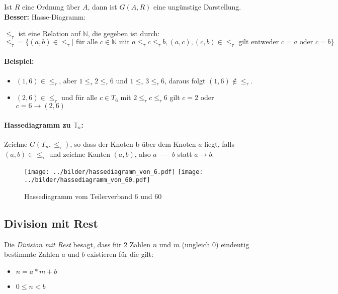 \noindent Ist $R$ eine Ordnung über $A$, dann ist $G (A, R)$ eine ungünstige Darstellung. \\ {\bf Besser:} Hasse-Diagramm:

$\le_\tau$ ist eine Relation auf $\mathbb{N}$, die gegeben ist durch: \\
$ \le_\tau = \{ (a, b) \in \le_\tau | \text{ für alle } c \in \mathbb{N} \text{ mit } a \le_\tau c \le_\tau b, (a, c), (c, b) \in \le_\tau \text{ gilt entweder } c = a \text{ oder } c = b \}$

\paragraph{Beispiel:}
\begin{itemize}
\item $(1, 6) \in \le_\tau$, aber $1 \le_\tau 2 \le_\tau 6$ und
                                 $1 \le_\tau 3 \le_\tau 6$,
  daraus folgt $(1, 6) \not\in\le_\tau$.
 \item $(2, 6) \in \le_\tau$ und für alle $c \in T_6$ mit $2 \le_\tau c \le_\tau 6$ gilt $c = 2$ oder $c = 6 \rightarrow (2, 6)$
\end{itemize}

\paragraph{Hassediagramm zu $\mathbb{T}_n$:}

Zeichne $G (T_n, \le_\tau)$, so dass der Knoten b über dem Knoten $a$
liegt, falls $(a, b) \in \le_\tau$ und zeichne Kanten $(a, b)$, also
$a$ ----- $b$ statt $a \longrightarrow b$. \\

\begin{figure}[h]
  \texttt{[image: ../bilder/hassediagramm\_von\_6.pdf]}
  \texttt{[image: ../bilder/hassediagramm\_von\_60.pdf]}
  \caption{Hassediagramm vom Teilerverband 6 und 60}
\end{figure}

\subsection{Division mit Rest}

Die \emph{Division mit Rest} besagt, dass für 2 Zahlen $n$ und $m$
(ungleich 0) eindeutig bestimmte Zahlen $a$ und $b$ existieren für die gilt:
\begin{itemize}
\item $n = a * m + b$
\item $0 \le n < b$
\end{itemize}

